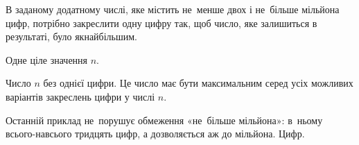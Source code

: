 ﻿В заданому додатному числі, яке містить не~менше двох і не~більше мільйона цифр, потрібно закреслити одну цифру так, щоб число, яке залишиться в результаті, було якнайбільшим.

\InputFile
Одне ціле значення $n$.

\OutputFile
Число $n$ без однієї цифри. Це число має бути максимальним серед усіх можливих варіантів закреслень цифри у числі $n$.

\Examples
\begin{examplewide}
\end{examplewide}

\Note

Останній приклад не~порушує обмеження «не~більше мільйона»: в~ньому всього-навсього тридцять цифр, а дозволяється аж до мільйона. Цифр.
